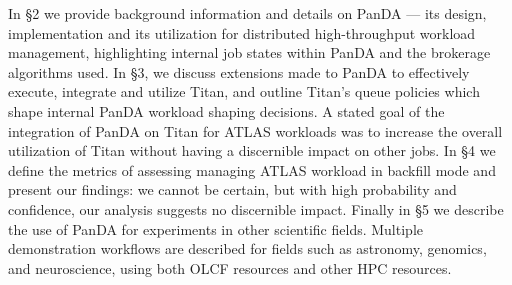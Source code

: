 





In \S2 we provide background information and details on PanDA --- its design,
implementation and its utilization for distributed high-throughput workload
management, highlighting internal job states within PanDA and the brokerage
algorithms used. In \S3, we discuss extensions made to PanDA to effectively
execute, integrate and utilize Titan, and outline Titan's queue policies which
shape internal PanDA workload shaping decisions. A stated goal of the
integration of PanDA on Titan for ATLAS workloads was to increase the overall
utilization of Titan without having a discernible impact on other jobs. In \S4
we define the metrics of assessing managing ATLAS workload in backfill mode
and present our findings: we cannot be certain, but with high probability and
confidence, our analysis suggests no discernible impact. Finally in \S5 we
describe the use of PanDA for experiments in other scientific fields. Multiple
demonstration workflows are described for fields such as astronomy, genomics,
and neuroscience, using both OLCF resources and other HPC resources.




